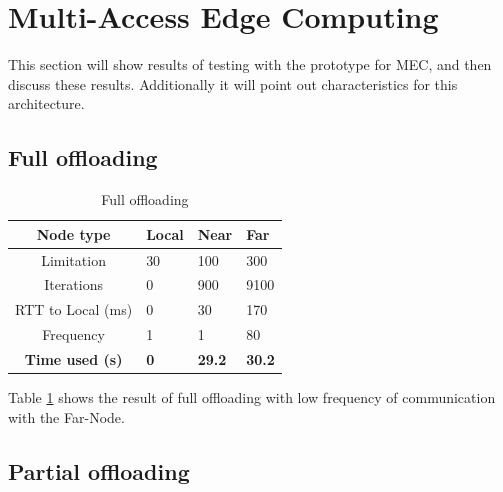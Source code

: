 

\section{Multi-Access Edge Computing} \label{section:MEC_evaluation}
This section will show results of testing with the prototype for MEC, and then discuss these results. Additionally it will point out characteristics for this architecture.

\subsection{Full offloading}




\begin{table}[h!]
    \centering
    \begin{tabular}[c]{|c||p{2cm}|p{2cm}|p{2cm}|}
        \hline
        Node type & Local & Near & Far \\
        \hline
        Limitation          & 30 & 100 & 300  \\
        \hline
        Iterations          & 0 & 900 & 9100  \\
        \hline
        RTT to Local (ms)   & 0 & 30 & 170 \\
        \hline
        Frequency           & 1 & 1 & 80 \\
        \hline
        \hline
        \hline
        \textbf{Time used (s)}       & \textbf{0} & \textbf{29.2} & \textbf{30.2} \\
        \hline
    \end{tabular}
    \caption{Full offloading}
    \label{tab:MEC_full_offloading_low_frequency}
\end{table}

Table \ref{tab:MEC_full_offloading_low_frequency} shows the result of full offloading with low frequency of communication with the Far-Node.






\subsection{Partial offloading}



